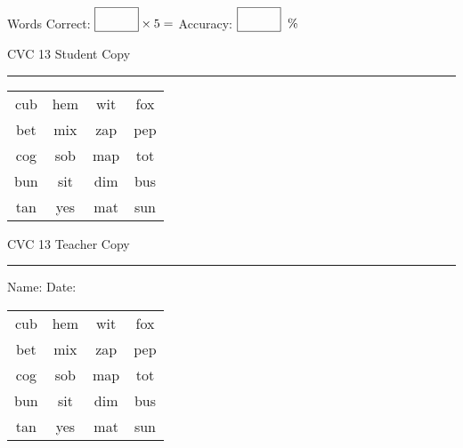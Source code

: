 \documentclass{memoir}
\begin{document}
\normalsize

Words Correct: $\fbox{\phantom{\huge 100}} \times 5 = $ Accuracy: $\fbox{\phantom{\huge 100}}\;\; \%$ 

\vfill

\newpage


\footnotesize \noindent
CVC 13 \hfill Student Copy
\smallskip
\hrule

\huge

\setlength{\tabcolsep}{14pt}
\def\arraystretch{2}

{\selectfont


\begin{vplace}[0.5]
\begin{center}
\begin{tabular}{cccc}
cub & hem & wit & fox \\
bet & mix & zap & pep \\
cog & sob & map & tot \\
bun & sit & dim & bus \\
tan & yes & mat & sun \\
\end{tabular}
\end{center}
\end{vplace}

}

\newpage

\footnotesize \noindent
CVC 13 \hfill Teacher Copy
\smallskip
\hrule

\normalsize

\vfill

\noindent
Name: \underline{\hspace{1.75in}} \hfill Date: \underline{\hspace{1in}}

\huge

{\selectfont


\begin{vplace}[0.5]
\begin{center}
\begin{tabular}{cccc}
cub & hem & wit & fox \\
bet & mix & zap & pep \\
cog & sob & map & tot \\
bun & sit & dim & bus \\
tan & yes & mat & sun \\
\end{tabular}
\end{center}
\end{vplace}



}
\end{document}
